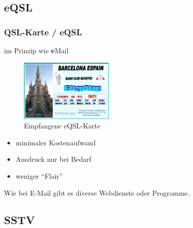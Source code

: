 \subsection{eQSL}

\begin{frame}
  \frametitle{QSL-Karte / eQSL}

  im Prinzip wie \textbf{e}Mail

  \begin{center}
    \begin{figure}
      \includegraphics[width=0.4\textwidth,height=.4\textheight,keepaspectratio]{bv13/eQSL_DK0TU-EA3ARE.jpg}
      \caption{Empfangene eQSL-Karte}
    \end{figure}
  \end{center}

  \begin{itemize}
    \item minimaler Kostenaufwand
    \item Ausdruck nur bei Bedarf
    \item weniger ``Flair''
  \end{itemize}

  Wie bei E-Mail gibt es diverse Webdienste oder Programme.

\end{frame}

\subsection{SSTV}

